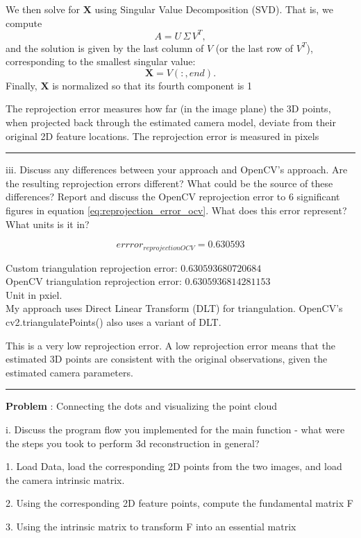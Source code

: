 \documentclass[onecolumn,10pt]{article}
\begin{document}
We then solve for \(\mathbf{X}\) using Singular Value Decomposition (SVD). That is, we compute
\[
A = U\,\Sigma\,V^T,
\]
and the solution is given by the last column of \(V\) (or the last row of \(V^T\)), corresponding to the smallest singular value:
\[
\mathbf{X} = V(:, end).
\]
Finally, \(\mathbf{X}\) is normalized so that its fourth component is 1

The reprojection error measures how far (in the image plane) the 3D points, when projected back through the estimated camera model, deviate from their original 2D feature locations. The reprojection error is measured in pixels

\hrule
iii. Discuss any differences between your approach and OpenCV's approach. Are the resulting reprojection errors different? What could be the source of these differences? Report and discuss the OpenCV reprojection error to 6 significant figures in equation \ref{eq:reprojection_error_ocv}. What does this error represent? What units is it in?

\begin{equation}
errror_{reprojectionOCV}=0.630593 \label{eq:reprojection_error_ocv}
\end{equation}

Custom triangulation reprojection error: $0.630593680720684$  \\
OpenCV triangulation reprojection error: $0.6305936814281153$ \\
Unit in pxiel. \\
My approach uses Direct Linear Transform (DLT) for triangulation. OpenCV’s cv2.triangulatePoints() also uses a variant of DLT.

This is a very low reprojection error. A low reprojection error means that the estimated 3D points are consistent with the original observations, given the estimated camera parameters.

\hrule
\addtocounter{problemnumber}{1}
\noindent\textbf{Problem }:  Connecting the dots and visualizing the point cloud

i. Discuss the program flow you implemented for the main function - what were the steps you took to perform 3d reconstruction in general?

1. Load Data, load the corresponding 2D points from the two images, and load the camera intrinsic matrix. 

2. Using the corresponding 2D feature points, compute the fundamental matrix F

3. Using the intrinsic matrix to transform F into an essential matrix
\end{document}
